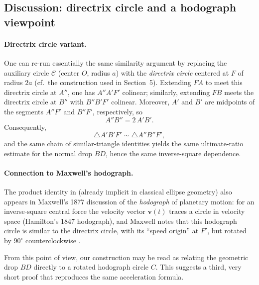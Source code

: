 \subsection{Discussion: directrix circle and a hodograph viewpoint}
\label{subsec:sec6-discussion}

\paragraph{Directrix circle variant.}
One can re-run essentially the same similarity argument by replacing the auxiliary circle $\mathcal C$ (center $O$, radius $a$) with the \emph{directrix circle} centered at $F$ of radius $2a$ (cf.\ the construction used in Section~5).
Extending $FA$ to meet this directrix circle at $A''$, one has $A''A'F'$ colinear; similarly, extending $FB$ meets the directrix circle at $B''$ with $B''B'F'$ colinear.
Moreover, $A'$ and $B'$ are midpoints of the segments $A''F'$ and $B''F'$, respectively, so
\begin{equation}
  A''B'' = 2\,A'B'.
\end{equation}
Consequently,
\begin{equation}
  \triangle A'B'F' \sim \triangle A''B''F',
\end{equation}
and the same chain of similar-triangle identities yields the same ultimate-ratio estimate for the normal drop $BD$, hence the same inverse-square dependence.

\paragraph{Connection to Maxwell's hodograph.}
The product identity in  (already implicit in classical ellipse geometry) also appears in Maxwell's 1877 discussion of the \emph{hodograph} of planetary motion: for an inverse-square central force the velocity vector $\mathbf v(t)$ traces a circle in velocity space (Hamilton's 1847 hodograph), and Maxwell notes that this hodograph circle is similar to the directrix circle, with its ``speed origin'' at $F'$, but rotated by $90^\circ$ counterclockwise \cite{maxwell1877mattermotion}.

From this point of view, our construction may be read as relating the geometric drop $BD$ directly to a rotated hodograph circle $C$.
This suggests a third, very short proof that reproduces the same acceleration formula.
